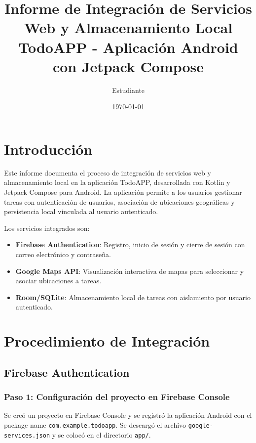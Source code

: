 \documentclass[12pt,a4paper]{article}
\title{\textbf{Informe de Integración de Servicios Web y Almacenamiento Local} \\ \large TodoAPP - Aplicación Android con Jetpack Compose}
\author{Estudiante}
\date{\today}
\begin{document}
\maketitle
\tableofcontents
\newpage

\section{Introducción}

Este informe documenta el proceso de integración de servicios web y almacenamiento local en la aplicación TodoAPP, desarrollada con Kotlin y Jetpack Compose para Android. La aplicación permite a los usuarios gestionar tareas con autenticación de usuarios, asociación de ubicaciones geográficas y persistencia local vinculada al usuario autenticado.

Los servicios integrados son:
\begin{itemize}
    \item \textbf{Firebase Authentication}: Registro, inicio de sesión y cierre de sesión con correo electrónico y contraseña.
    \item \textbf{Google Maps API}: Visualización interactiva de mapas para seleccionar y asociar ubicaciones a tareas.
    \item \textbf{Room/SQLite}: Almacenamiento local de tareas con aislamiento por usuario autenticado.
\end{itemize}

\section{Procedimiento de Integración}

\subsection{Firebase Authentication}

\subsubsection{Paso 1: Configuración del proyecto en Firebase Console}

Se creó un proyecto en Firebase Console y se registró la aplicación Android con el package name \texttt{com.example.todoapp}. Se descargó el archivo \texttt{google-services.json} y se colocó en el directorio \texttt{app/}.
\end{document}
